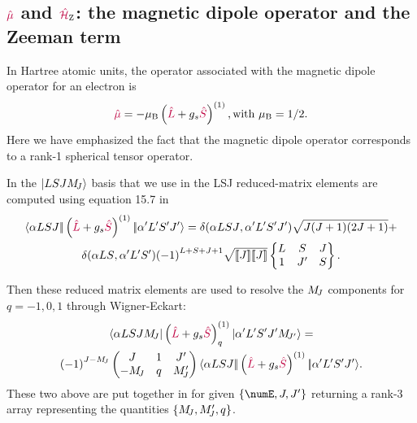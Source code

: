 \documentclass[11pt, twoside,openright]{article}
\begin{document}
\noindent{}

\vspace{-0.2cm}



\vspace{0.2cm}

\noindent{}

\vspace{0.2cm}



\subsection{\texorpdfstring{$\textcolor{purple}{\hat{\mu}}$ and $\textcolor{purple}{\hat{\mathcal{H}}}_{\text{Z}}$: the magnetic dipole operator and the Zeeman term}{μ and $HZ$: the magnetic dipole operator and the Zeeman term}}

In Hartree atomic units, the operator associated with the magnetic dipole operator for an electron is
\begin{equation}
\textcolor{purple}{\hat{\mu}} = -\mu_\text{B} \left(\textcolor{purple}{\hat{L}} + g_s\textcolor{purple}{\hat{S}} \right)^{(1)}, \text{with }\mu_\text{B}=1/2.
\end{equation}
Here we have emphasized the fact that the magnetic dipole operator corresponds to a rank-1 spherical tensor operator.

In the $|LSJM_{\!{J}}\rangle$ basis that we use in \qlanth the LSJ reduced-matrix elements are computed using equation 15.7 in \cite{cowan_theory_1981}
\begin{multline}
    \langle \alpha{LSJ}|\!|\left(\textcolor{purple}{\hat{L}} + g_s \textcolor{purple}{\hat{S}}\right)^{(1)}|\!|\alpha'{L'S'J'}\rangle =
    \delta(\alpha{LSJ},\alpha'{L'S'J'})
    \sqrt{J(J+1)(2J+1)} + \\
    \delta(\alpha{LS},\alpha'{L'S'})
    {(-1)}^{L+S+J+1}
    \sqrt{[\![J]\!][\![J]\!]}
    \begin{Bmatrix} L & S & J \\ 1 & J' & S \end{Bmatrix}.
\end{multline}

Then these reduced matrix elements are used to resolve the $M_{\!{J}}$ components for $q=-1,0,1$ through Wigner-Eckart:
\begin{multline}
    \langle \alpha{LSJ}M_{\!{J}}|\left(\textcolor{purple}{\hat{L}} + g_s \textcolor{purple}{\hat{S}}\right)^{(1)}_q|\alpha'{L'S'J'}M_{\!{J'}}\rangle = \\
    {(-1)}^{J-M_{\!{J}}}
    \begin{pmatrix} J & 1 & J' \\ -M_{\!{J}} & q & M_{\!{J}}' \end{pmatrix}
    \langle \alpha{LSJ}|\!|\left(\textcolor{purple}{\hat{L}} + g_s \textcolor{purple}{\hat{S}}\right)^{(1)}|\!|\alpha'{L'S'J'}\rangle.
\end{multline} 
These two above are put together in  for given $\{\numE, J, J'\}$ returning a rank-3 array representing the quantities $\{M_{\!{J}},M_{\!{J}}',q\}$.
\end{document}

